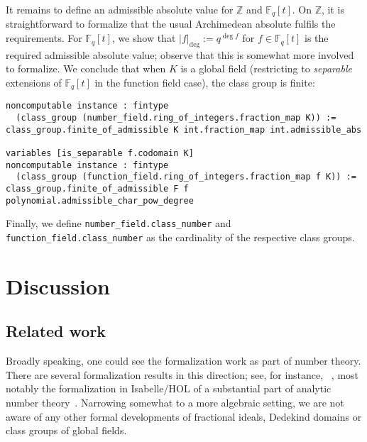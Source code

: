\documentclass[a4paper,USenglish,cleveref, autoref, thm-restate]{lipics-v2021}
\newcommand{\lean}[1]{\texttt{#1}\xspace} %
\newcommand*{\Fq}[1][q]{\mathbb{F}_{#1}}
\newcommand{\Z}{\mathbb{Z}}
\begin{document}
It remains to define an admissible absolute value for $\Z$ and $\Fq[q][t]$. On $\Z$, it is straightforward to formalize that the usual Archimedean absolute fulfils the requirements. For $\Fq[q][t]$, we show that $\lvert f\rvert_{\deg}:=q^{\deg f}$ for $f \in \Fq[q][t]$ is the required admissible absolute value; observe that this is somewhat more involved to formalize.
We conclude that when $K$ is a global field (restricting to \emph{separable} extensions of $\Fq[q][t]$ in the function field case), the class group is finite:
\begin{lstlisting}
noncomputable instance : fintype
  (class_group (number_field.ring_of_integers.fraction_map K)) :=
class_group.finite_of_admissible K int.fraction_map int.admissible_abs

variables [is_separable f.codomain K]
noncomputable instance : fintype
  (class_group (function_field.ring_of_integers.fraction_map f K)) :=
class_group.finite_of_admissible F f polynomial.admissible_char_pow_degree
\end{lstlisting}

Finally, we define \lean{number\_field.class\_number} and \lean{function\_field.class\_number} as the cardinality of the respective class groups.

\section{Discussion}

\subsection{Related work}

Broadly speaking, one could see the formalization work as part of number theory. There are several formalization results in this direction; see, for instance, ~\cite[Section 6]{CapSetProblem}, most notably the formalization in Isabelle/HOL of a substantial part of analytic number theory~\cite{Eberl19}.
Narrowing somewhat to a more algebraic setting, we are not aware of any other formal developments of fractional ideals, Dedekind domains or class groups of global fields.
\end{document}
